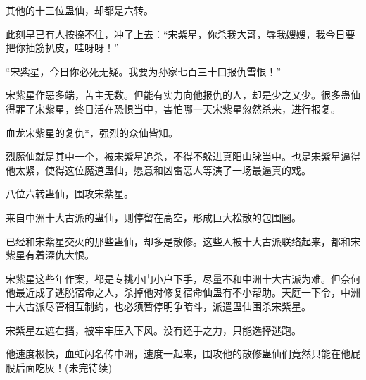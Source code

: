 \begin{this_body}
其他的十三位蛊仙，却都是六转。

此刻早已有人按捺不住，冲了上去：“宋紫星，你杀我大哥，辱我嫂嫂，我今日要把你抽筋扒皮，哇呀呀！”

“宋紫星，今日你必死无疑。我要为孙家七百三十口报仇雪恨！”

宋紫星作恶多端，苦主无数。但能有实力向他报仇的人，却是少之又少。很多蛊仙得罪了宋紫星，终日活在恐惧当中，害怕哪一天宋紫星忽然杀来，进行报复。

血龙宋紫星的复仇*，强烈的众仙皆知。

烈魔仙就是其中一个，被宋紫星追杀，不得不躲进真阳山脉当中。也是宋紫星逼得他太紧，使得这位魔道蛊仙，愿意和凶雷恶人等演了一场最逼真的戏。

八位六转蛊仙，围攻宋紫星。

来自中洲十大古派的蛊仙，则停留在高空，形成巨大松散的包围圈。

已经和宋紫星交火的那些蛊仙，却多是散修。这些人被十大古派联络起来，都和宋紫星有着深仇大恨。

宋紫星这些年作案，都是专挑小门小户下手，尽量不和中洲十大古派为难。但奈何他最近成了逃脱宿命之人，杀掉他对修复宿命仙蛊有不小帮助。天庭一下令，中洲十大古派尽管相互制约，也必须暂停明争暗斗，派遣蛊仙围杀宋紫星。

宋紫星左遮右挡，被牢牢压入下风。没有还手之力，只能选择逃跑。

他速度极快，血虹闪名传中洲，速度一起来，围攻他的散修蛊仙们竟然只能在他屁股后面吃灰！(未完待续)

\end{this_body}

